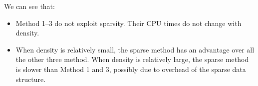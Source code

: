 \documentclass[a4paper,11pt]{article}
\begin{document}
We can see that:
\begin{itemize}
	\item Method 1--3 do not exploit sparsity. Their CPU times do not change with density.
	\item When density is relatively small, the sparse method has an advantage over all the other three method. When density is relatively large, the sparse method is slower than Method 1 and 3, possibly due to overhead of the sparse data structure.
\end{itemize} 








%
%
\end{document}
